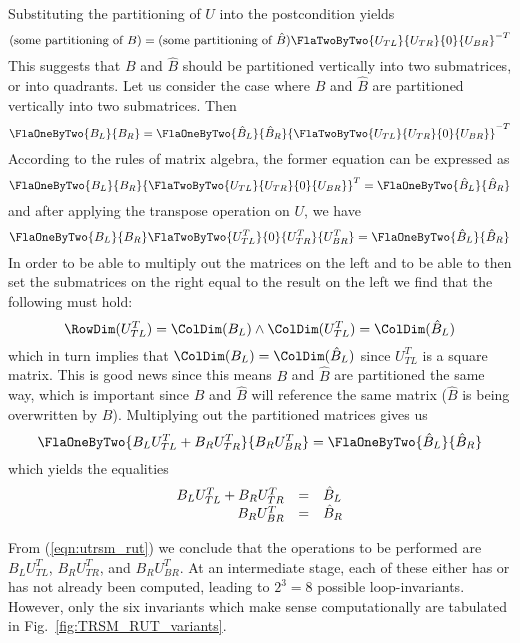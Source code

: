 Substituting the partitioning of $ U $ into the postcondition yields
\[
( \mbox{some partitioning of }{B} )
= 
( \mbox{some partitioning of }\hat{B} )
{ \FlaTwoByTwo{ U_{TL} }{ U_{TR} }
            {   0    }{ U_{BR} } }^{-T}
\]
This suggests that $ B $ and $ \hat{B} $ should be partitioned
vertically into two submatrices, or into quadrants.  Let us consider
the case where $ B $ and $ \hat{B} $ are partitioned vertically into
two submatrices.  Then
\[
\FlaOneByTwo{ B_L }
            { B_R }
= 
\FlaOneByTwo{ \hat{B}_L }
            { \hat{B}_R }
{ \FlaTwoByTwo{ U_{TL} }{ U_{TR} }
              {   0    }{ U_{BR} } }^{-T}     
\]
According to the rules of matrix algebra, the former equation can be expressed as
\[
\FlaOneByTwo{ B_L }
            { B_R }
{ \FlaTwoByTwo{ U_{TL} }{ U_{TR} }
              {   0    }{ U_{BR} } }^{T}    
= 
\FlaOneByTwo{ \hat{B}_L }
            { \hat{B}_R }      
\]
and after applying the transpose operation on $ U $, we have
\[
\FlaOneByTwo{ B_L }
            { B_R }
\FlaTwoByTwo{ U_{TL}^{T} }{   0    }
            { U_{TR}^{T} }{ U_{BR}^{T} }   
= 
\FlaOneByTwo{ \hat{B}_L }
            { \hat{B}_R }      
\]
In order to be able to multiply out the matrices on the left and to
be able to then set the submatrices on the right equal to the result on
the left we find that the following must hold:
\[
\RowDim( U_{TL}^T ) = \ColDim( {B}_L ) 
\wedge
\ColDim( U_{TL}^T ) = \ColDim( \hat{B}_L ) 
\]
which in turn implies that $ \ColDim( B_L )= \ColDim( \hat{B}_L ) $
since $ U_{TL}^T $ is a square matrix.  This is good news since this
means $ B $ and $ \hat{B} $ are partitioned the same way, which is
important since $ B $ and $ \hat{B}$ will reference the same matrix ($
\hat{B} $ is being overwritten by $ B $).  Multiplying out the 
partitioned matrices gives us
\[
\FlaOneByTwo{ B_{L} U_{TL}^{T} + B_{R} U_{TR}^{T} }
            { B_{R} U_{BR}^{T}  }
=
\FlaOneByTwo{ \hat{B}_{L} }
            { \hat{B}_{R} }
\]
which yields the equalities
\begin{equation}
\label{eqn:utrsm_rut}
\begin{array}{r c l}
B_{L} U_{TL}^{T} + B_{R} U_{TR}^{T} &=& \hat{B}_{L} \\
B_{R} U_{BR}^{T}                    &=& \hat{B}_{R}
\end{array}
\end{equation}



From (\ref{eqn:utrsm_rut}) we conclude that the operations to be
performed are $ B_{L} U_{TL}^{T} $, $ B_{R} U_{TR}^{T} $, and $ B_{R} 
U_{BR}^{T} $.  At an intermediate stage, each of these either has or
has not already been computed, leading to $ 2^3 = 8 $ possible
loop-invariants. However, only the six invariants which make sense 
computationally are tabulated in Fig.~\ref{fig:TRSM_RUT_variants}.

